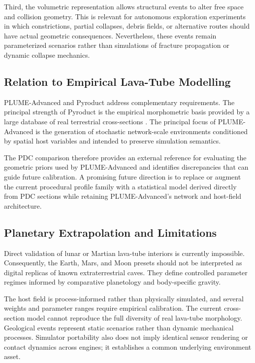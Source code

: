 \documentclass[conference]{IEEEtran}
\begin{document}
Third, the volumetric representation allows structural events to alter free space and collision geometry. This is relevant for autonomous exploration experiments in which constrictions, partial collapses, debris fields, or alternative routes should have actual geometric consequences. Nevertheless, these events remain parameterized scenarios rather than simulations of fracture propagation or dynamic collapse mechanics.

\subsection{Relation to Empirical Lava-Tube Modelling}

PLUME-Advanced and Pyroduct address complementary requirements. The principal strength of Pyroduct is the empirical morphometric basis provided by a large database of real terrestrial cross-sections \cite{pyroduct2026,pdc2025}. The principal focus of PLUME-Advanced is the generation of stochastic network-scale environments conditioned by spatial host variables and intended to preserve simulation semantics.

The PDC comparison therefore provides an external reference for evaluating the geometric priors used by PLUME-Advanced and identifies discrepancies that can guide future calibration. A promising future direction is to replace or augment the current procedural profile family with a statistical model derived directly from PDC sections while retaining PLUME-Advanced's network and host-field architecture.

\subsection{Planetary Extrapolation and Limitations}

Direct validation of lunar or Martian lava-tube interiors is currently impossible. Consequently, the Earth, Mars, and Moon presets should not be interpreted as digital replicas of known extraterrestrial caves. They define controlled parameter regimes informed by comparative planetology and body-specific gravity.

The host field is process-informed rather than physically simulated, and several weights and parameter ranges require empirical calibration. The current cross-section model cannot reproduce the full diversity of real lava-tube morphology. Geological events represent static scenarios rather than dynamic mechanical processes. Simulator portability also does not imply identical sensor rendering or contact dynamics across engines; it establishes a common underlying environment asset.
\end{document}
